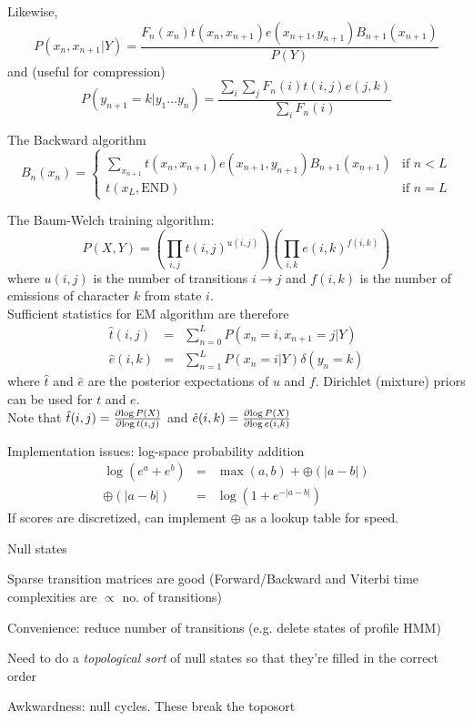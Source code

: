 \documentclass{beamer}
\begin{document}
\begin{frame}{}
\itemb

\item Likewise,
\[
P(x_n,x_{n+1}|Y) = \frac{F_n(x_n)t(x_n,x_{n+1})e(x_{n+1},y_{n+1})B_{n+1}(x_{n+1})}{P(Y)}
\]
and (useful for compression)
\[
P(y_{n+1}=k|y_1 \ldots y_n) = \frac{\sum_i \sum_j F_n(i) t(i,j) e(j,k)}{\sum_i F_n(i)}
\]
\item The Backward algorithm
\[
B_n(x_n) = \left\{ \begin{array}{ll} \displaystyle
\sum_{x_{n+1}} t(x_n,x_{n+1}) e(x_{n+1},y_{n+1}) B_{n+1}(x_{n+1}) & \mbox{if $n < L$} \\
t(x_L,\mbox{END}) & \mbox{if $n=L$}
\end{array} \right.
\]
\iteme
\end{frame}

\begin{frame}{}
\tiny
The Baum-Welch training algorithm:
\[
P(X,Y) = \left( \prod_{i,j} t(i,j)^{u(i,j)} \right) \left( \prod_{i,k} e(i,k)^{f(i,k)} \right)
\]
where $u(i,j)$ is the number of transitions $i \to j$ and $f(i,k)$ is the number of emissions of character $k$ from state $i$.
\\
Sufficient statistics for EM algorithm are therefore
\begin{eqnarray*}
\hat{t}(i,j) & = & \sum_{n=0}^L P(x_n=i,x_{n+1}=j|Y) \\
\hat{e}(i,k) & = & \sum_{n=1}^L P(x_n=i|Y) \delta(y_n=k)
\end{eqnarray*}
where $\hat{t}$ and $\hat{e}$ are the posterior expectations of $u$ and $f$.
Dirichlet (mixture) priors can be used for $t$ and $e$.
\\
Note that $\hat{t}(i,j) = \frac{\partial {\log P(X)}}{\partial {\log t(i,j)}}$ and $\hat{e}(i,k)=\frac{\partial {\log P(X)}}{\partial {\log e(i,k)}}$
\end{frame}

\begin{frame}{}
Implementation issues: log-space probability addition
\begin{eqnarray*}
\log(e^a+e^b) & = & \max(a,b) + \oplus(|a-b|) \\
\oplus(|a-b|) & = & \log(1+e^{-|a-b|})
\end{eqnarray*}
If scores are discretized, can implement $\oplus$ as a lookup table for speed.
\end{frame}

\begin{frame}{}
Null states
 \itemb
 \item Sparse transition matrices are good (Forward/Backward and Viterbi time complexities are $\propto$ no. of transitions)
 \item Convenience: reduce number of transitions (e.g. delete states of profile HMM)
 \item Need to do a {\em topological sort} of null states so that they're filled in the correct order
 \item Awkwardness: null cycles. These break the toposort
 \iteme
\end{frame}
\end{document}
